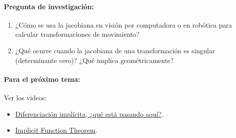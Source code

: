 \documentclass[a4,11pt]{aleph-notas}
\begin{document}
\paragraph{Pregunta de investigación:}
\begin{enumerate}[leftmargin=*]
    \item ¿Cómo se usa la jacobiana en visión por computadora o en robótica para calcular transformaciones de movimiento?
    \item ¿Qué ocurre cuando la jacobiana de una transformación es singular (determinante cero)? ¿Qué implica geométricamente?
\end{enumerate}

\paragraph{Para el próximo tema:}
Ver los videos:
\begin{itemize}[leftmargin=*]
    \item \href{https://youtu.be/qb40J4N1fa4?si=edqBdY06q7YXj68v}{Diferenciación implícita, ¿qué está pasando aquí?}.
    \item \href{https://youtu.be/SUfJPLNZwBo?si=xHjCz3ZnXwdLOpaz}{Implicit Function Theorem}.
\end{itemize}
\end{document}

